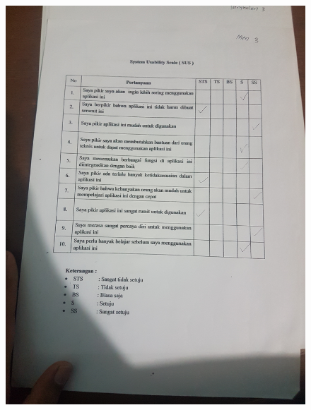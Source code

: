 \begin{figure}[H]
	\center
	\includegraphics [width = 17cm,angle=-90]{gambar/pengujian/agen3}
\end{figure}

